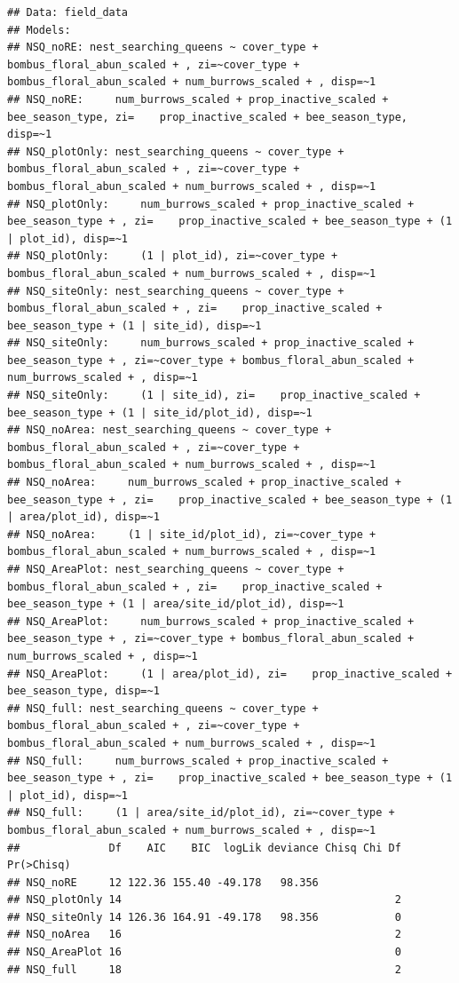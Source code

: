 \documentclass[
]{article}
\begin{document}
\begin{verbatim}
## Data: field_data
## Models:
## NSQ_noRE: nest_searching_queens ~ cover_type + bombus_floral_abun_scaled + , zi=~cover_type + bombus_floral_abun_scaled + num_burrows_scaled + , disp=~1
## NSQ_noRE:     num_burrows_scaled + prop_inactive_scaled + bee_season_type, zi=    prop_inactive_scaled + bee_season_type, disp=~1
## NSQ_plotOnly: nest_searching_queens ~ cover_type + bombus_floral_abun_scaled + , zi=~cover_type + bombus_floral_abun_scaled + num_burrows_scaled + , disp=~1
## NSQ_plotOnly:     num_burrows_scaled + prop_inactive_scaled + bee_season_type + , zi=    prop_inactive_scaled + bee_season_type + (1 | plot_id), disp=~1
## NSQ_plotOnly:     (1 | plot_id), zi=~cover_type + bombus_floral_abun_scaled + num_burrows_scaled + , disp=~1
## NSQ_siteOnly: nest_searching_queens ~ cover_type + bombus_floral_abun_scaled + , zi=    prop_inactive_scaled + bee_season_type + (1 | site_id), disp=~1
## NSQ_siteOnly:     num_burrows_scaled + prop_inactive_scaled + bee_season_type + , zi=~cover_type + bombus_floral_abun_scaled + num_burrows_scaled + , disp=~1
## NSQ_siteOnly:     (1 | site_id), zi=    prop_inactive_scaled + bee_season_type + (1 | site_id/plot_id), disp=~1
## NSQ_noArea: nest_searching_queens ~ cover_type + bombus_floral_abun_scaled + , zi=~cover_type + bombus_floral_abun_scaled + num_burrows_scaled + , disp=~1
## NSQ_noArea:     num_burrows_scaled + prop_inactive_scaled + bee_season_type + , zi=    prop_inactive_scaled + bee_season_type + (1 | area/plot_id), disp=~1
## NSQ_noArea:     (1 | site_id/plot_id), zi=~cover_type + bombus_floral_abun_scaled + num_burrows_scaled + , disp=~1
## NSQ_AreaPlot: nest_searching_queens ~ cover_type + bombus_floral_abun_scaled + , zi=    prop_inactive_scaled + bee_season_type + (1 | area/site_id/plot_id), disp=~1
## NSQ_AreaPlot:     num_burrows_scaled + prop_inactive_scaled + bee_season_type + , zi=~cover_type + bombus_floral_abun_scaled + num_burrows_scaled + , disp=~1
## NSQ_AreaPlot:     (1 | area/plot_id), zi=    prop_inactive_scaled + bee_season_type, disp=~1
## NSQ_full: nest_searching_queens ~ cover_type + bombus_floral_abun_scaled + , zi=~cover_type + bombus_floral_abun_scaled + num_burrows_scaled + , disp=~1
## NSQ_full:     num_burrows_scaled + prop_inactive_scaled + bee_season_type + , zi=    prop_inactive_scaled + bee_season_type + (1 | plot_id), disp=~1
## NSQ_full:     (1 | area/site_id/plot_id), zi=~cover_type + bombus_floral_abun_scaled + num_burrows_scaled + , disp=~1
##              Df    AIC    BIC  logLik deviance Chisq Chi Df Pr(>Chisq)
## NSQ_noRE     12 122.36 155.40 -49.178   98.356                        
## NSQ_plotOnly 14                                           2           
## NSQ_siteOnly 14 126.36 164.91 -49.178   98.356            0           
## NSQ_noArea   16                                           2           
## NSQ_AreaPlot 16                                           0           
## NSQ_full     18                                           2
\end{verbatim}
\end{document}
